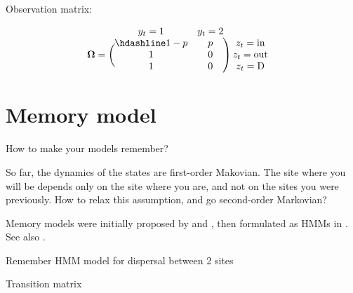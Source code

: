 \documentclass[
  12pt,
]{krantz}
\begin{document}
Observation matrix:

\[\begin{matrix}
& \\
\mathbf{\Omega} =
  \left ( \vphantom{ \begin{matrix} 12 \\ 12 \end{matrix} } \right .
          \end{matrix}
          \hspace{-1.2em}
          \begin{matrix}
          y_t=1 & y_t=2 \\ \hdashline
          1 - p & p\\
          1 & 0\\
          1 & 0
          \end{matrix}
          \hspace{-0.2em}
          \begin{matrix}
          & \\
          \left . \vphantom{ \begin{matrix} 12 \\ 12 \\ 12 \end{matrix} } \right )
\begin{matrix}
z_{t}=\text{in} \\ z_{t}=\text{out} \\ z_{t}=\text{D}
\end{matrix}
\end{matrix}\]

\section{Memory model}\label{memorymodel}

How to make your models remember?

So far, the dynamics of the states are first-order Makovian. The site where you will be depends only on the site where you are, and not on the sites you were previously. How to relax this assumption, and go second-order Markovian?

Memory models were initially proposed by \citet{hestbeck1991estimates} and \citet{BrownieEtAl1993}, then formulated as HMMs in \citet{rouan2009memory}. See also \citet{cole2014}.

Remember HMM model for dispersal between 2 sites

Transition matrix
\end{document}
